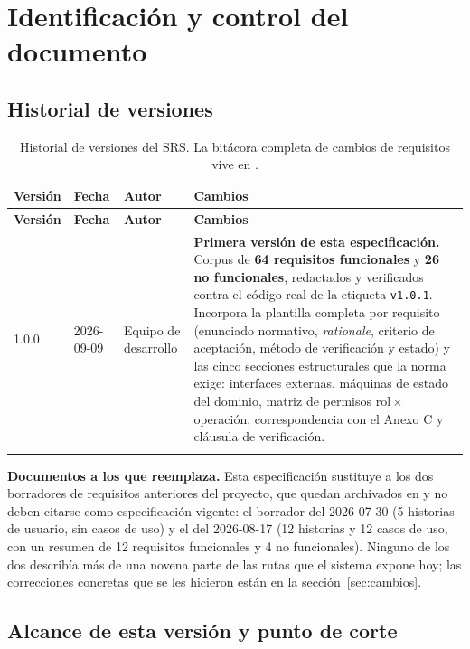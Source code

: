 \documentclass[11pt,a4paper]{article}
\DeclareRobustCommand{\cd}[1]{\texttt{\protect\seqsplit{#1}}}
\begin{document}
\tableofcontents
\newpage

\section{Identificación y control del documento}

\subsection{Historial de versiones}

\begin{longtable}{p{1.6cm} p{1.8cm} p{2.6cm} p{8.2cm}}
\toprule
\textbf{Versión} & \textbf{Fecha} & \textbf{Autor} & \textbf{Cambios} \\
\midrule
\endfirsthead
\toprule
\textbf{Versión} & \textbf{Fecha} & \textbf{Autor} & \textbf{Cambios} \\
\midrule
\endhead
1.0.0 & 2026-09-09 & Equipo de desarrollo &
\textbf{Primera versión de esta especificación.} Corpus de \textbf{64 requisitos funcionales} y
\textbf{26 no funcionales}, redactados y verificados contra el código real de la etiqueta
\texttt{v1.0.1}. Incorpora la plantilla completa por requisito (enunciado normativo,
\emph{rationale}, criterio de aceptación, método de verificación y estado) y las cinco secciones
estructurales que la norma exige: interfaces externas, máquinas de estado del dominio, matriz de
permisos rol\,$\times$\,operación, correspondencia con el Anexo C y cláusula de verificación. \\
\bottomrule
\caption{Historial de versiones del SRS. La bitácora completa de cambios de requisitos
vive en \cd{docs/requisitos/CHANGELOG-REQ.md}.}
\end{longtable}

\noindent\textbf{Documentos a los que reemplaza.} Esta especificación sustituye a los dos
borradores de requisitos anteriores del proyecto, que quedan archivados en
\cd{docs/requisitos/historico/} y no deben citarse como especificación vigente: el borrador del
2026-07-30 (5 historias de usuario, sin casos de uso) y el del 2026-08-17 (12 historias y 12 casos
de uso, con un resumen de 12 requisitos funcionales y 4 no funcionales). Ninguno de los dos
describía más de una novena parte de las rutas que el sistema expone hoy; las correcciones
concretas que se les hicieron están en la sección~\ref{sec:cambios}.

\subsection{Alcance de esta versión y punto de corte}
\end{document}
